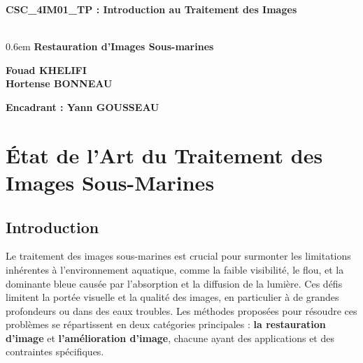 \documentclass[10pt, a4paper]{extarticle}
\numberwithin{equation}{section}
\numberwithin{figure}{section}
\begin{document}
\fancyhf{}
\renewcommand{\headrulewidth}{.6pt}
 
\pagestyle{fancy}

\vspace*{40mm}
\begin{center}
    \Huge
    
    \textbf{CSC\_4IM01\_TP : Introduction au Traitement des Images}\vspace*{1mm}\\
\vspace*{26mm}\\
\Huge
\fboxsep0.6em
\textbf{Restauration d'Images Sous-marines}
\vspace*{11mm}\\
\end{center}
\vspace*{50mm}
\begin{center}
\textbf{\Large Fouad KHELIFI}\vspace{2mm}\\ 
\textbf{\Large Hortense BONNEAU} 
\end{center}
\vspace*{20mm}
\textbf{Encadrant : Yann GOUSSEAU} 
\newpage
\fancyhf{}
\renewcommand{\headrulewidth}{.6pt}
\fancyhead[R]{\small \leftmark}
\setlength{\headheight}{10pt}
\renewcommand{\footrulewidth}{.6pt}
\fancyfoot[C]{\thepage}
\pagestyle{fancy}
\tableofcontents
\newpage

\section{\'Etat de l'Art du Traitement des Images Sous-Marines}
\subsection{Introduction}
\par Le traitement des images sous-marines est crucial pour surmonter les limitations inhérentes à l'environnement aquatique, comme la faible visibilité, le flou, et la dominante bleue causée par l'absorption et la diffusion de la lumière. Ces défis limitent la portée visuelle et la qualité des images, en particulier à de grandes profondeurs ou dans des eaux troubles. Les méthodes proposées pour résoudre ces problèmes se répartissent en deux catégories principales : \textbf{la restauration d'image} et \textbf{l'amélioration d'image}, chacune ayant des applications et des contraintes spécifiques.
\end{document}
